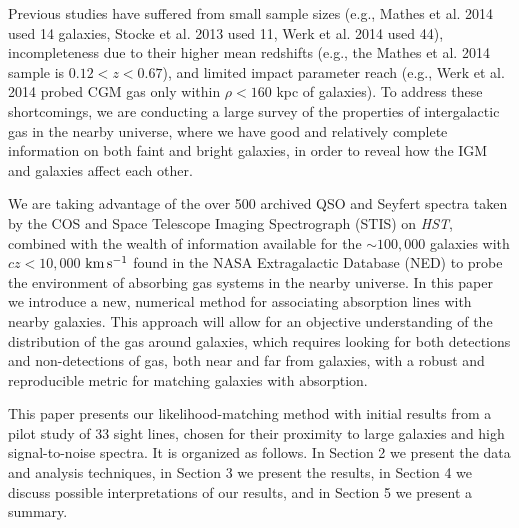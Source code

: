 Previous studies have suffered from small sample sizes (e.g., Mathes et al. 2014 used 14 galaxies, Stocke et al. 2013 used 11, Werk et al. 2014 used 44), incompleteness due to their higher mean redshifts (e.g., the Mathes et al. 2014 sample is $0.12 <z<0.67$), and limited impact parameter reach (e.g., Werk et al. 2014 probed CGM gas only within $\rho < 160$ kpc of galaxies). To address these shortcomings, we are conducting a large survey of the properties of intergalactic gas in the nearby universe, where we have good and relatively complete information on both faint and bright galaxies, in order to reveal how the IGM and galaxies affect each other. 

We are taking advantage of the over 500 archived QSO and Seyfert spectra taken by the COS and Space Telescope Imaging Spectrograph (STIS) on \textit{HST}, combined with the wealth of information available for the $\sim100,000$ galaxies with $cz<10,000$ $\rm km\, s^{-1}$ found in the NASA Extragalactic Database (NED) to probe the environment of absorbing gas systems in the nearby universe. In this paper we introduce a new, numerical method for associating absorption lines with nearby galaxies. This approach will allow for an objective understanding of the distribution of the gas around galaxies, which requires looking for both detections and non-detections of gas, both near and far from galaxies, with a robust and reproducible metric for matching galaxies with absorption.

This paper presents our likelihood-matching method with initial results from a pilot study of 33 sight lines, chosen for their proximity to large galaxies and high signal-to-noise spectra. It is organized as follows. In Section 2 we present the data and analysis techniques, in Section 3 we present the results, in Section 4 we discuss possible interpretations of our results, and in Section 5 we present a summary.


